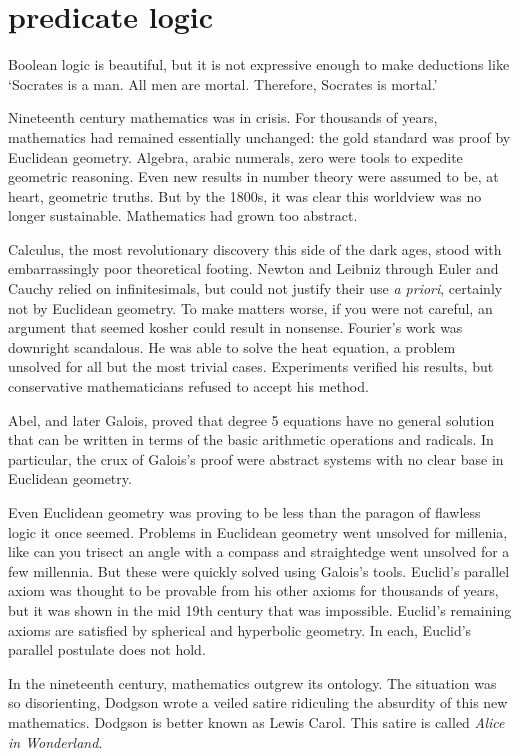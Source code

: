 \documentclass{scrbook}
\begin{document}
\chapter[Predicate Logic]{predicate logic}
Boolean logic is beautiful, but it is not expressive enough to make deductions like `Socrates is a man. All men are mortal. Therefore, Socrates is mortal.' 

Nineteenth century mathematics was in crisis. For thousands of years, mathematics had remained essentially unchanged: the gold standard was proof by Euclidean geometry. Algebra, arabic numerals, zero were tools to expedite geometric reasoning. Even new results in number theory were assumed to be, at heart, geometric truths. But by the 1800s, it was clear this worldview was no longer sustainable. Mathematics had grown too abstract.

Calculus, the most revolutionary discovery this side of the dark ages, stood with embarrassingly poor theoretical footing. Newton and Leibniz through Euler and Cauchy relied on infinitesimals, but could not justify their use \emph{a priori}, certainly not by Euclidean geometry. To make matters worse, if you were not careful, an argument that seemed kosher could result in nonsense. 
Fourier's work was downright scandalous. He was able to solve the heat equation, a problem unsolved for all but the most trivial cases. Experiments verified his results, but conservative mathematicians refused to accept his method.

Abel, and later Galois, proved that degree 5 equations have no general solution that can be written in terms of the basic arithmetic operations and radicals. In particular, the crux of Galois's proof were abstract systems with no clear base in Euclidean geometry. 

Even Euclidean geometry was proving to be less than the paragon of flawless logic it once seemed. Problems in Euclidean geometry went unsolved for millenia, like can you trisect an angle with a compass and straightedge went unsolved for a few millennia. But these were quickly solved using Galois's tools\cite{wiki:trisect}. Euclid's parallel axiom was thought to be provable from his other axioms for thousands of years, but it was shown in the mid 19th century that was impossible. Euclid's remaining axioms are satisfied by spherical and hyperbolic geometry. In each, Euclid's parallel postulate does not hold. 

In the nineteenth century, mathematics outgrew its ontology. The situation was so disorienting, Dodgson wrote a veiled satire ridiculing the absurdity of this new mathematics. Dodgson is better known as Lewis Carol. This satire is called \emph{Alice in Wonderland}.\cite{alice}
\end{document}
